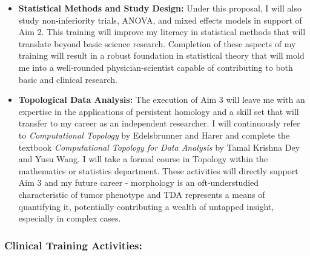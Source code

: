 \documentclass{NIHGrant}
\begin{document}
\begin{itemize}[leftmargin=*, nosep]
  \item \textbf{Statistical Methods and Study Design:} Under this proposal, I will also study non-inferiority trials, ANOVA, and mixed effects models in support of Aim 2. This training will improve my literacy in statistical methods that will translate beyond basic science research. Completion of these aspects of my training will result in a robust foundation in statistical theory that will mold me into a well-rounded physician-scientist capable of contributing to both basic and clinical research.
  \item \textbf{Topological Data Analysis:} The execution of Aim 3 will leave me with an expertise in the applications of persistent homology and a skill set that will transfer to my career as an independent researcher. I will continuously refer to \textit{Computational Topology} by Edelsbrunner and Harer and complete the textbook \textit{Computational Topology for Data Analysis} by Tamal Krishna Dey and Yusu Wang. I will take a formal course in Topology within the mathematics or statistics department. These activities will directly support Aim 3 and my future career - morphology is an oft-understudied characteristic of tumor phenotype and TDA represents a means of quantifying it, potentially contributing a wealth of untapped insight, especially in complex cases.
\end{itemize}

\subsubsection*{Clinical Training Activities:}
\end{document}
